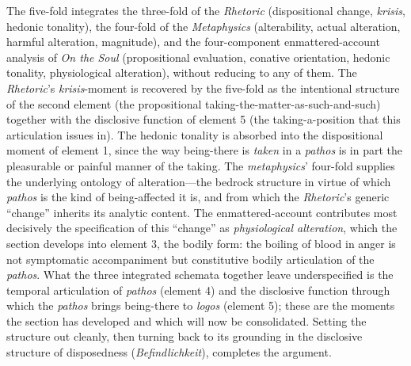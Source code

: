 \documentclass{article}
\begin{document}
The five-fold integrates the three-fold of the \textit{Rhetoric} (dispositional change, \textit{krisis}, hedonic tonality), the four-fold of the \textit{Metaphysics} (alterability, actual alteration, harmful alteration, magnitude), and the four-component enmattered-account analysis of \textit{On the Soul} (propositional evaluation, conative orientation, hedonic tonality, physiological alteration), without reducing to any of them. The \textit{Rhetoric}'s \textit{krisis}-moment is recovered by the five-fold as the intentional structure of the second element (the propositional taking-the-matter-as-such-and-such) together with the disclosive function of element 5 (the taking-a-position that this articulation issues in). The hedonic tonality is absorbed into the dispositional moment of element 1, since the way being-there is \textit{taken} in a \textit{pathos} is in part the pleasurable or painful manner of the taking. The \textit{metaphysics}' four-fold supplies the underlying ontology of alteration---the bedrock structure in virtue of which \textit{pathos} is the kind of being-affected it is, and from which the \textit{Rhetoric}'s generic ``change'' inherits its analytic content. The enmattered-account contributes most decisively the specification of this ``change'' as \textit{physiological alteration}, which the section develops into element 3, the bodily form: the boiling of blood in anger is not symptomatic accompaniment but constitutive bodily articulation of the \textit{pathos}. What the three integrated schemata together leave underspecified is the temporal articulation of \textit{pathos} (element 4) and the disclosive function through which the \textit{pathos} brings being-there to \textit{logos} (element 5); these are the moments the section has developed and which will now be consolidated. Setting the structure out cleanly, then turning back to its grounding in the disclosive structure of disposedness (\textit{Befindlichkeit}), completes the argument. 
\end{document}
